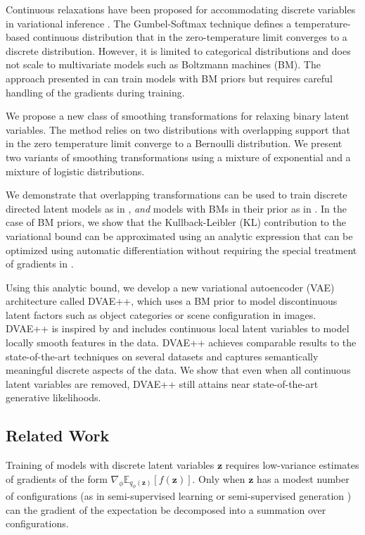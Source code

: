 \documentclass{article}
\newcommand{\z}{{\pmb{z}}}
\begin{document}
Continuous relaxations have been proposed for accommodating discrete variables in variational inference 
\cite{maddison2016concrete, jang2016categorical, rolfe2016discrete}. 
The Gumbel-Softmax technique \cite{maddison2016concrete, jang2016categorical}
defines a temperature-based continuous distribution that in the zero-temperature limit converges to a discrete distribution. However, it is limited to categorical distributions and 
does not scale to multivariate models such as Boltzmann machines (BM). The approach presented in 
\cite{rolfe2016discrete} can train models with BM priors but requires careful handling of the gradients during training.

We propose a new class of smoothing transformations for relaxing binary latent variables. The method relies on two 
distributions with overlapping support that in the zero temperature limit converge to a Bernoulli distribution.
We present two variants of smoothing transformations using a mixture of exponential and a mixture of logistic distributions.

We demonstrate that overlapping transformations can be used to train discrete directed
latent models as in \cite{maddison2016concrete, jang2016categorical}, \textit{and} models with BMs in their prior as in \cite{rolfe2016discrete}.
In the case of BM priors, we show that the Kullback-Leibler (KL) contribution to the variational bound can be approximated using an analytic expression that can be optimized using automatic differentiation without requiring the special treatment of gradients in \cite{rolfe2016discrete}.

Using this analytic bound, we develop a new variational autoencoder (VAE) architecture called DVAE++, 
which uses a BM prior to model discontinuous latent factors such as object categories or scene configuration in images. 
DVAE++ is inspired by \cite{rolfe2016discrete} and includes continuous local latent variables to model locally 
smooth features in the data. DVAE++ achieves 
comparable results to the state-of-the-art techniques on several datasets 
and captures semantically meaningful discrete aspects of the data. 
We show that even when all continuous latent variables are removed, DVAE++ still attains near state-of-the-art generative 
likelihoods.

\subsection{Related Work}
Training of models with discrete latent variables $\z$ requires low-variance estimates of gradients of the form $\nabla_\phi \mathbb{E}_{q_{\phi}(\z)}[f(\z)]$. Only when $\z$ has a modest number of configurations 
(as in semi-supervised learning \cite{kingma2014semi} or semi-supervised generation \cite{maaloe2017semi}) 
can the gradient of the expectation be decomposed into a summation over configurations.
\end{document}
